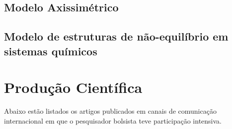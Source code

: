 \documentclass[a4paper,portuges,12pt]{article}
\begin{document}
\subsection{Modelo Axissimétrico}


\subsection{Modelo de estruturas de não-equilíbrio em sistemas químicos}


\section{Produção Científica}

Abaixo estão listados os artigos publicados em canais de comunicação
internacional em que o pesquisador bolsista teve participação intensiva.
\end{document}
